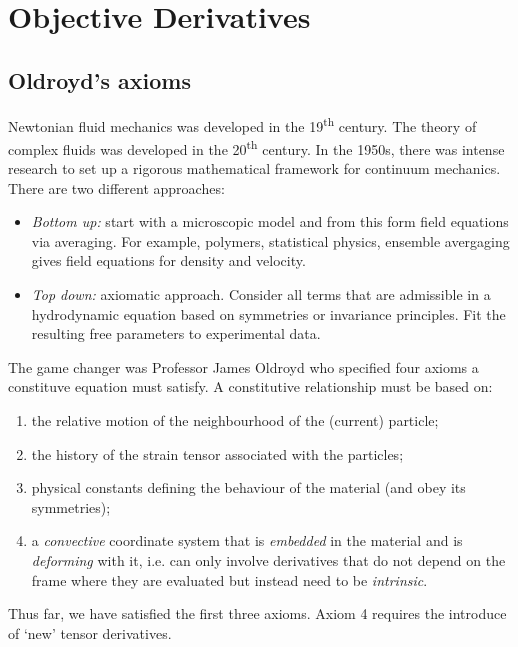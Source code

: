 \documentclass{jknotes}
\begin{document}
\section{Objective Derivatives}
\subsection{Oldroyd's axioms}
Newtonian fluid mechanics was developed in the 19\textsuperscript{th} century.
The theory of complex fluids was developed in the 20\textsuperscript{th}
century. In the 1950s, there was intense research to set up a rigorous
mathematical framework for continuum mechanics. There are two different
approaches:
\begin{itemize}
	\item \emph{Bottom up:} start with a microscopic model and from this form
		field equations via averaging. For example, polymers, statistical
		physics, ensemble avergaging gives field equations for density and
		velocity.
	\item \emph{Top down:} axiomatic approach. Consider all terms that are
		admissible in a hydrodynamic equation based on symmetries or
		invariance principles. Fit the resulting free parameters to
		experimental data.
\end{itemize}

The game changer was Professor James Oldroyd who specified four axioms a
constituve equation must satisfy. A constitutive relationship must be based
on:
\begin{enumerate}
	\item the relative motion of the neighbourhood of the (current) particle;
	\item the history of the strain tensor associated with the particles;
	\item physical constants defining the behaviour of the material (and obey
		its symmetries);
	\item a \emph{convective} coordinate system that is \emph{embedded} in the
		material and is \emph{deforming} with it, i.e. can only involve
		derivatives that do not depend on the frame where they are evaluated
		but instead need to be \emph{intrinsic}.
\end{enumerate}

Thus far, we have satisfied the first three axioms. Axiom 4 requires the
introduce of `new' tensor derivatives.
\end{document}

